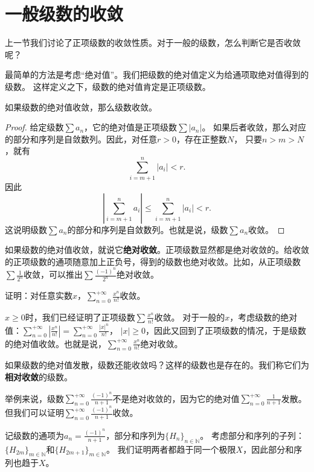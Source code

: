 \documentclass[12pt,UTF8]{ctexbook}
\begin{document}
\section{一般级数的收敛}
上一节我们讨论了正项级数的收敛性质。对于一般的级数，怎么判断它是否收敛呢？

最简单的方法是考虑“绝对值”。我们把级数的绝对值定义为给通项取绝对值得到的级数。
这样定义之下，级数的绝对值肯定是正项级数。

\begin{tm}
    如果级数的绝对值收敛，那么级数收敛。
\end{tm}

\begin{proof}
    给定级数$\sum a_n$，它的绝对值是正项级数$\sum |a_n|$。
    如果后者收敛，那么对应的部分和序列是自敛数列。因此，对任意$r>0$，存在正整数$N$，
    只要$n>m>N$，就有
    $$ \sum_{i=m+1}^n |a_i| < r. $$
    因此
    $$ \left|\sum_{i=m+1}^n a_i \right| \leqslant \sum_{i=m+1}^n |a_i| < r. $$
    这说明级数$\sum a_n$的部分和序列是自敛数列。也就是说，级数$\sum a_n$收敛。
\end{proof}

如果级数的绝对值收敛，就说它\textbf{绝对收敛}。正项级数显然都是绝对收敛的。给收敛的正项级数的通项随意加上正负号，得到的级数也绝对收敛。比如，从正项级数$\sum \frac{1}{2^n}$收敛，可以推出$\sum \frac{(-1)^{n}}{2^n}$绝对收敛。

\begin{et}
    证明：对任意实数$x$，$\sum_{n=0}^{+\infty}\frac{x^{n}}{n!}$收敛。
\end{et}
\begin{so}
    $x\geqslant 0$时，我们已经证明了正项级数$\sum \frac{x^{n}}{n!}$收敛。
    对于一般的$x$，考虑级数的绝对值：$\sum_{n=0}^{+\infty}\left|\frac{x^{n}}{n!}\right| = \sum_{n=0}^{+\infty}\frac{|x|^{n}}{n!}$，
    $|x|\geqslant 0$，因此又回到了正项级数的情况，于是级数的绝对值收敛。也就是说，$\sum_{n=0}^{+\infty}\frac{x^{n}}{n!}$绝对收敛。
\end{so}

如果级数的绝对值发散，级数还能收敛吗？这样的级数也是存在的。我们称它们为\textbf{相对收敛}的级数。

举例来说，级数$\sum_{n=0}^{+\infty} \frac{(-1)^{n}}{n+1}$不是绝对收敛的，因为它的绝对值$\sum_{n=0}^{+\infty} \frac{1}{n+1}$发散。但我们可以证明$\sum_{n=0}^{+\infty} \frac{(-1)^{n}}{n+1}$收敛。

记级数的通项为$a_n = \frac{(-1)^{n}}{n+1}$，部分和序列为$\{H_{n}\}_{n\in\mathbb{N}}$。
考虑部分和序列的子列：$\{H_{2m}\}_{m\in\mathbb{N}}$和$\{H_{2m+1}\}_{m\in\mathbb{N}}$。
我们证明两者都趋于同一个极限$X$，因此部分和序列也趋于$X$。
\end{document}
